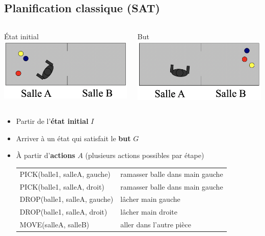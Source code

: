 \documentclass[english,french,usenames,dvipsnames]{beamer}
\begin{document}
\subsection{Planification classique (SAT)}
\begin{frame}{\subsecname}
\begin{columns}[T,onlytextwidth]
\begin{column}{0.45\textwidth}\centering
État initial\\
\includegraphics[width=\textwidth]{figures/gripper-start.png}
\end{column}
\begin{column}{0.45\textwidth} \centering
But\\
\includegraphics[width=\textwidth]{figures/gripper-end.png}
\end{column}
\end{columns}
\begin{itemize}
    \item Partir de l'\textbf{état initial} $I$
    \item Arriver à un état qui satisfait le \textbf{but} $G$
    \item À partir d'\textbf{actions} $A$ {\scriptsize{}(plusieurs actions possibles par étape)} \\[10pt]
\begin{small}\begin{tabular}{l|l}
    PICK(balle1, salleA, gauche) & ramasser balle dans main gauche \\
    PICK(balle1, salleA, droit) & ramasser balle dans main gauche \\[5pt]
    DROP(balle1, salleA, gauche) & lâcher main gauche \\
    DROP(balle1, salleA, droit) & lâcher main droite \\[5pt]
    MOVE(salleA, salleB) & aller dans l'autre pièce
\end{tabular}\end{small}
\end{itemize}
\end{frame}
\end{document}

